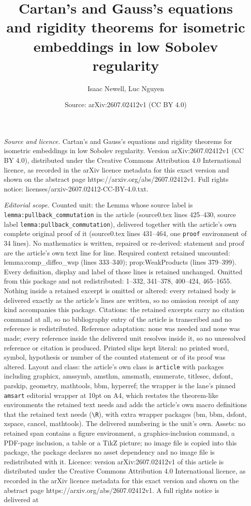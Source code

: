 \documentclass[10pt,a4paper]{amsart}
\title[Cartan's and Gauss's equations and rigidity theorems for iso]{Cartan's and Gauss's equations and rigidity theorems for isometric embeddings in low Sobolev regularity}
\author{Isaac Newell, Luc Nguyen}
\date{Source: arXiv:2607.02412v1 (CC BY 4.0)}
\begin{document}
\maketitle

\noindent\emph{Source and licence.} Cartan's and Gauss's equations and rigidity theorems for isometric embeddings in low Sobolev regularity. Version arXiv:2607.02412v1 (CC BY 4.0), distributed under the Creative Commons Attribution 4.0 International licence, as recorded in the arXiv licence metadata for this exact version and shown on the abstract page https://arxiv.org/abs/2607.02412v1. Full rights notice: licenses/arxiv-2607.02412-CC-BY-4.0.txt.\par\smallskip

\noindent\textit{Editorial scope.} Counted unit: the Lemma whose source label is \texttt{lemma:pullback\_commutation} in the article (source0.tex lines 425--430, source label \texttt{lemma:pullback\_commutation}), delivered together with the article's own complete original proof of it (source0.tex lines 431--464, one \texttt{proof} environment of 34 lines). No mathematics is written, repaired or re-derived: statement and proof are the article's own text line for line. Required context retained uncounted: lemma:comp\_diffeo\_wsp (lines 333--340); prop:WeakProducts (lines 379--399). Every definition, display and label of those lines is retained unchanged. Omitted from this package and not redistributed: 1--332, 341--378, 400--424, 465--1655. Nothing inside a retained excerpt is omitted or altered: every retained body is delivered exactly as the article's lines are written, so no omission receipt of any kind accompanies this package. Citations: the retained excerpts carry no citation command at all, so no bibliography entry of the article is transcribed and no reference is redistributed. Reference adaptation: none was needed and none was made; every reference inside the delivered unit resolves inside it, so no unresolved reference or citation is produced. Printed slips kept literal: no printed word, symbol, hypothesis or number of the counted statement or of its proof was altered. Layout and class: the article's own class is \texttt{article} with packages including graphicx, amssymb, amsthm, amsmath, enumerate, titlesec, dsfont, parskip, geometry, mathtools, bbm, hyperref; the wrapper is the lane's pinned \texttt{amsart} editorial wrapper at 10pt on A4, which restates the theorem-like environments the retained text needs and adds the article's own macro definitions that the retained text needs (\texttt{\textbackslash R}), with extra wrapper packages (bm, bbm, dsfont, xspace, cancel, mathtools). The delivered numbering is the unit's own. Assets: no retained span contains a figure environment, a graphics-inclusion command, a PDF-page inclusion, a table or a TikZ picture; no image file is copied into this package, the package declares no asset dependency and no image file is redistributed with it. Licence: version arXiv:2607.02412v1 of this article is distributed under the Creative Commons Attribution 4.0 International licence, as recorded in the arXiv licence metadata for this exact version and shown on the abstract page https://arxiv.org/abs/2607.02412v1. A full rights notice is delivered at 
\end{document}
